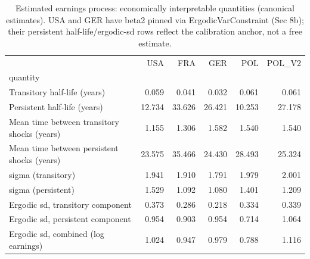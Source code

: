 \begin{table}
\caption{Estimated earnings process: economically interpretable quantities (canonical estimates). USA and GER have beta2 pinned via ErgodicVarConstraint (Sec 8b); their persistent half-life/ergodic-sd rows reflect the calibration anchor, not a free estimate.}
\label{tab:economic_params}
\begin{tabular}{lrrrrr}
\toprule
 & USA & FRA & GER & POL & POL_V2 \\
quantity &  &  &  &  &  \\
\midrule
Transitory half-life (years) & 0.059 & 0.041 & 0.032 & 0.061 & 0.061 \\
Persistent half-life (years) & 12.734 & 33.626 & 26.421 & 10.253 & 27.178 \\
Mean time between transitory shocks (years) & 1.155 & 1.306 & 1.582 & 1.540 & 1.540 \\
Mean time between persistent shocks (years) & 23.575 & 35.466 & 24.430 & 28.493 & 25.324 \\
sigma (transitory) & 1.941 & 1.910 & 1.791 & 1.979 & 2.001 \\
sigma (persistent) & 1.529 & 1.092 & 1.080 & 1.401 & 1.209 \\
Ergodic sd, transitory component & 0.373 & 0.286 & 0.218 & 0.334 & 0.339 \\
Ergodic sd, persistent component & 0.954 & 0.903 & 0.954 & 0.714 & 1.064 \\
Ergodic sd, combined (log earnings) & 1.024 & 0.947 & 0.979 & 0.788 & 1.116 \\
\bottomrule
\end{tabular}
\end{table}
